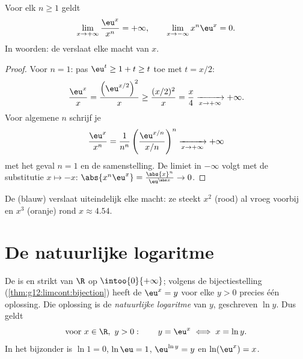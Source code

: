\begin{theorem}\label{thm:g12:exp:growth}
Voor elk  $n \geq 1$ geldt
\[
\lim_{x\to+\infty} \frac{\eu^x}{x^n} = +\infty,
\qquad
\lim_{x\to-\infty} x^n \eu^x = 0 .
\]
In woorden: de  verslaat elke macht van $x$.
\end{theorem}

\begin{proof}
Voor $n = 1$: pas $\eu^t \geq 1 + t \geq t$ toe met $t = x/2$:
\[
\frac{\eu^x}{x} = \frac{\left(\eu^{x/2}\right)^2}{x}
\geq \frac{(x/2)^2}{x} = \frac{x}{4} \xrightarrow[x\to+\infty]{} +\infty .
\]
Voor algemene $n$ schrijf je
\[
\frac{\eu^x}{x^n}
= \frac{1}{n^n}\left(\frac{\eu^{x/n}}{x/n}\right)^{n}
\xrightarrow[x\to+\infty]{} +\infty
\]
met het geval $n=1$ en de samenstelling. De limiet in $-\infty$ volgt met de
substitutie $x \mapsto -x$:
$\abs{x^n \eu^x} = \frac{\abs{x}^n}{\eu^{\abs x}} \to 0$.
\end{proof}

\begin{omfigure}

{\small De  (blauw) verslaat uiteindelijk elke macht: ze
steekt $x^2$ (rood) al vroeg voorbij en $x^3$ (oranje) rond
$x \approx 4.54$.}
\end{omfigure}

\section{De natuurlijke logaritme}

\begin{definition}\label{def:g12:exp:ln}
De  is  en strikt  van $\R$ op
$\intoo{0}{+\infty}$; volgens de bijectiestelling
(\cref{thm:g12:limcont:bijection}) heeft de  $\eu^x = y$ voor elke
$y > 0$ precies één oplossing. Die oplossing is de \emph{natuurlijke
logaritme} van $y$, geschreven $\ln y$. Dus geldt
\[
\text{voor } x \in \R,\ y > 0: \qquad y = \eu^x \iff x = \ln y .
\]
In het bijzonder is $\ln 1 = 0$, $\ln \eu = 1$, $\eu^{\ln y} = y$ en
$\ln(\eu^x) = x$.
\end{definition}

